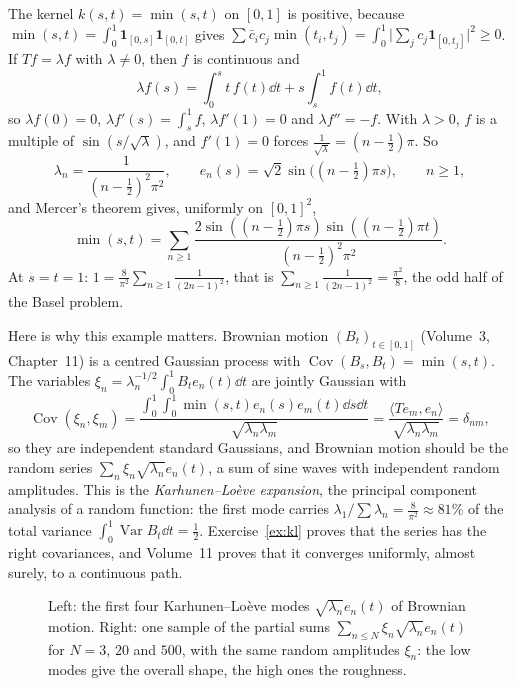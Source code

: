\begin{example}\label{ex:minkernel}
The kernel $k(s,t)=\min(s,t)$ on $[0,1]$ is positive, because $\min(s,t)=\int_0^1\mathbf 1_{[0,s]}\mathbf 1_{[0,t]}$ gives $\sum\bar c_ic_j\min(t_i,t_j)=\int_0^1\bigl|\sum_jc_j\mathbf 1_{[0,t_j]}\bigr|^2\ge0$. If $Tf=\lambda f$ with
$\lambda\ne0$, then $f$ is continuous and
\[\lambda f(s)=\int_0^st\,f(t)\dd t+s\int_s^1f(t)\dd t,\]
so $\lambda f(0)=0$, $\lambda f'(s)=\int_s^1f$, $\lambda f'(1)=0$ and $\lambda f''=-f$. With $\lambda>0$, $f$ is a multiple of $\sin(s/\sqrt\lambda)$, and $f'(1)=0$ forces $\frac1{\sqrt\lambda}=(n-\frac12)\pi$. So
\[\lambda_n=\frac1{(n-\frac12)^2\pi^2},\qquad e_n(s)=\sqrt2\sin\bigl((n-\tfrac12)\pi s\bigr),\qquad n\ge1,\]
and Mercer's theorem gives, uniformly on $[0,1]^2$,
\[\min(s,t)=\sum_{n\ge1}\frac{2\sin((n-\frac12)\pi s)\sin((n-\frac12)\pi t)}{(n-\frac12)^2\pi^2}.\]
At $s=t=1$: $1=\frac8{\pi^2}\sum_{n\ge1}\frac1{(2n-1)^2}$, that is $\sum_{n\ge1}\frac1{(2n-1)^2}=\frac{\pi^2}8$, the odd half of the Basel problem.
\end{example}

Here is why this example matters. Brownian motion $(B_t)_{t\in[0,1]}$ (Volume~3, Chapter~11) is a centred Gaussian process with $\operatorname{Cov}(B_s,B_t)=\min(s,t)$. The variables $\xi_n=\lambda_n^{-1/2}\int_0^1B_te_n(t)\dd t$ are
jointly Gaussian with
\[\operatorname{Cov}(\xi_n,\xi_m)=\frac{\int_0^1\!\int_0^1\min(s,t)e_n(s)e_m(t)\dd s\dd t}{\sqrt{\lambda_n\lambda_m}}=\frac{\langle Te_m,e_n\rangle}{\sqrt{\lambda_n\lambda_m}}=\delta_{nm},\]
so they are independent standard Gaussians, and Brownian motion should be the random series $\sum_n\xi_n\sqrt{\lambda_n}e_n(t)$, a sum of sine waves with independent random amplitudes. This is the
\emph{Karhunen--Lo\`eve expansion}, the principal component analysis of a random function: the first mode carries $\lambda_1/\sum\lambda_n=\frac{8}{\pi^2}\approx81\%$ of the total variance $\int_0^1\operatorname{Var}B_t\dd t=\frac12$.
Exercise~\ref{ex:kl} proves that the series has the right covariances, and Volume~11 proves that it converges uniformly, almost surely, to a continuous path.

\begin{figure}[ht]
\centering
{}
\caption{Left: the first four Karhunen--Lo\`eve modes $\sqrt{\lambda_n}e_n(t)$ of Brownian motion. Right: one sample of the partial sums $\sum_{n\le N}\xi_n\sqrt{\lambda_n}e_n(t)$ for $N=3$, $20$ and $500$, with the same random
amplitudes $\xi_n$: the low modes give the overall shape, the high ones the roughness.}
\label{fig:kl}
\end{figure}

